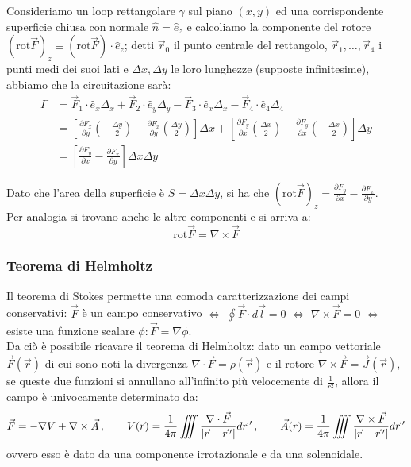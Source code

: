 Consideriamo un loop rettangolare $ \gamma $ sul piano $ \left(x,y\right) $ ed una corrispondente superficie chiusa con normale $ \hat{n} = \hat{e}_z $ e calcoliamo la componente del rotore $ ( \text{rot}\vec{F} )_z \equiv (\text{rot}\vec{F}) \cdot \hat{e}_z $; detti $ \vec{r}_0 $ il punto centrale del rettangolo, $ \vec{r}_1, \dots, \vec{r}_4 $ i punti medi dei suoi lati e $ \Delta x, \Delta y $ le loro lunghezze (supposte infinitesime), abbiamo che la circuitazione sarà:
\begin{equation}
\begin{split}
	\Gamma &= \vec{F}_1 \cdot \hat{e}_x \Delta_x + \vec{F}_2 \cdot \hat{e}_y \Delta_y - \vec{F}_3 \cdot \hat{e}_x \Delta_x - \vec{F}_4 \cdot \hat{e}_4 \Delta_4 \\
	       &= \left[ \frac{\partial F_x}{\partial y} \left( - \frac{\Delta y}{2} \right) - \frac{\partial F_x}{\partial y} \left( \frac{\Delta y}{2} \right) \right] \Delta x + \left[ \frac{\partial F_y}{\partial x} \left( \frac{\Delta x}{2} \right) - \frac{\partial F_y}{\partial x} \left( - \frac{\Delta x}{2} \right)  \right] \Delta y \\
	       &= \left[ \frac{\partial F_y}{\partial x} - \frac{\partial F_x}{\partial y} \right] \Delta x \Delta y
\end{split}
	\label{eq:}
\end{equation}

Dato che l'area della superficie è $ S = \Delta x \Delta y $, si ha che $ (\text{rot} \vec{F})_z = \frac{\partial F_y}{\partial x} - \frac{\partial F_x}{\partial y} $.\\
%
Per analogia si trovano anche le altre componenti e si arriva a:
\begin{equation}
	\text{rot} \vec{F} = \nabla \times \vec{F}
	\label{eq:rotore}
\end{equation}

\subsubsection{Teorema di Helmholtz}

Il teorema di Stokes permette una comoda caratterizzazione dei campi conservativi: $ \vec{F} $ è un campo conservativo $ \iff $ $ \oint \vec{F} \cdot d\vec{l} = 0 $ $ \iff $ $ \nabla\times \vec{F} = 0 $ $ \iff $ esiste una funzione scalare $ \phi : \vec{F} = \nabla\phi $. \\
%
Da ciò è possibile ricavare il teorema di Helmholtz: dato un campo vettoriale $ \vec{F}(\vec{r}) $ di cui sono noti la divergenza $ \nabla\cdot \vec{F} = \rho(\vec{r}) $ e il rotore $ \nabla\times \vec{F} = \vec{J}(\vec{r}) $, se queste due funzioni si annullano all'infinito più velocemente di $ \frac{1}{r^2} $, allora il campo è univocamente determinato da:
\begin{equation}
	\vec{F} = - \nabla V + \nabla\times \vec{A} \, , \qquad V(\vec{r}) = \frac{1}{4\pi} \iiint \displaystyle\frac{\nabla\cdot \vec{F}}{\left\lvert\vec{r} - \vec{r}\,'\right\rvert} d\vec{r}\,' \, , \qquad \vec{A}(\vec{r}) = \frac{1}{4\pi} \iiint \displaystyle\frac{\nabla\times \vec{F}}{\left\lvert\vec{r} - \vec{r}\,'\right\rvert} d\vec{r}\,'
	\label{eq:th-helmholtz}
\end{equation}
ovvero esso è dato da una componente irrotazionale e da una solenoidale.
